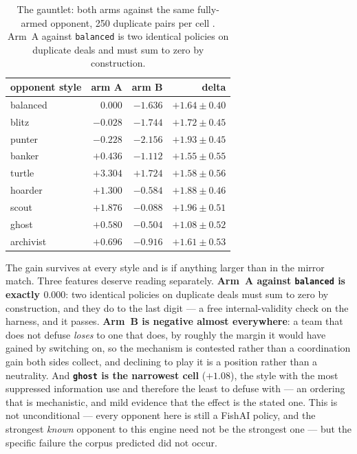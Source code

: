 \documentclass[11pt]{article}
\newcommand{\code}[1]{\texttt{#1}}
\begin{document}
\begin{table}[t]
\centering
\caption{The gauntlet: both arms against the same fully-armed opponent, 250 duplicate pairs
per cell \cite{concession}. Arm~A against \code{balanced} is two identical policies on duplicate
deals and must sum to zero by construction.}
\label{tab:gauntlet}
\footnotesize
\begin{tabular}{@{}lrrr@{}}
\toprule
opponent style & arm A & arm B & \textbf{delta} \\
\midrule
balanced  & $0.000$  & $-1.636$ & $\mathbf{+1.64 \pm 0.40}$ \\
blitz     & $-0.028$ & $-1.744$ & $\mathbf{+1.72 \pm 0.45}$ \\
punter    & $-0.228$ & $-2.156$ & $\mathbf{+1.93 \pm 0.45}$ \\
banker    & $+0.436$ & $-1.112$ & $\mathbf{+1.55 \pm 0.55}$ \\
turtle    & $+3.304$ & $+1.724$ & $\mathbf{+1.58 \pm 0.56}$ \\
hoarder   & $+1.300$ & $-0.584$ & $\mathbf{+1.88 \pm 0.46}$ \\
scout     & $+1.876$ & $-0.088$ & $\mathbf{+1.96 \pm 0.51}$ \\
ghost     & $+0.580$ & $-0.504$ & $\mathbf{+1.08 \pm 0.52}$ \\
archivist & $+0.696$ & $-0.916$ & $\mathbf{+1.61 \pm 0.53}$ \\
\bottomrule
\end{tabular}
\end{table}

The gain survives at every style and is if anything larger than in the mirror match. Three features
deserve reading separately. \textbf{Arm~A against \code{balanced} is exactly $0.000$}: two identical
policies on duplicate deals must sum to zero by construction, and they do to the last digit --- a
free internal-validity check on the harness, and it passes. \textbf{Arm~B is negative almost
everywhere}: a team that does not defuse \emph{loses} to one that does, by roughly the margin it
would have gained by switching on, so the mechanism is contested rather than a coordination gain
both sides collect, and declining to play it is a position rather than a neutrality. And
\textbf{\code{ghost} is the narrowest cell} ($+1.08$), the style with the most suppressed
information use and therefore the least to defuse with --- an ordering that is mechanistic, and mild
evidence that the effect is the stated one. This is not unconditional --- every opponent here is
still a FishAI policy, and the strongest \emph{known} opponent to this engine need not be the
strongest one --- but the specific failure the corpus predicted did not occur.
\end{document}
